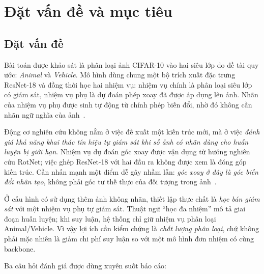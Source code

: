 \section{Đặt vấn đề và mục tiêu}
\label{sec:intro}

\subsection{Đặt vấn đề}
\label{sec:intro-problem}

Bài toán được khảo sát là phân loại ảnh CIFAR-10 vào hai siêu lớp do đề tài quy ước:
\emph{Animal} và \emph{Vehicle}. Mô hình dùng chung một bộ trích xuất đặc trưng ResNet-18 và
đồng thời học hai nhiệm vụ: nhiệm vụ chính là phân loại siêu lớp có giám sát, nhiệm vụ phụ là
dự đoán phép xoay đã được áp dụng lên ảnh. Nhãn của nhiệm vụ phụ được sinh tự động từ chính
phép biến đổi, nhờ đó không cần nhãn ngữ nghĩa của ảnh~\cite{he2016resnet,gidaris2018rotnet}.

Động cơ nghiên cứu không nằm ở việc đề xuất một kiến trúc mới, mà ở việc \emph{đánh giá khả
năng khai thác tín hiệu tự giám sát khi số ảnh có nhãn dùng cho huấn luyện bị giới hạn}.
Nhiệm vụ dự đoán góc xoay được vận dụng từ hướng nghiên cứu RotNet; việc ghép ResNet-18 với
hai đầu ra không được xem là đóng góp kiến trúc. Cần nhấn mạnh một điểm dễ gây nhầm lẫn:
\emph{góc xoay ở đây là góc biến đổi nhân tạo}, không phải góc tư thế thực của đối tượng
trong ảnh~\cite{gidaris2018rotnet}.

Ở cấu hình có sử dụng thêm ảnh không nhãn, thiết lập thực chất là \emph{học bán giám sát} với
một nhiệm vụ phụ tự giám sát. Thuật ngữ \enquote{học đa nhiệm} mô tả giai đoạn huấn luyện;
khi suy luận, hệ thống chỉ giữ nhiệm vụ phân loại Animal/Vehicle. Vì vậy lợi ích cần kiểm
chứng là \emph{chất lượng phân loại}, chứ không phải mặc nhiên là giảm chi phí suy luận so với
một mô hình đơn nhiệm có cùng backbone.

Ba câu hỏi đánh giá được dùng xuyên suốt báo cáo:

